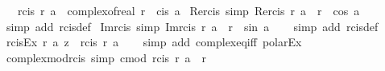 \begin{isabellebody}
\ \ \ {\isachardoublequoteopen}rcis\ r\ a\ {\isacharequal}{\kern0pt}\ complex{\isacharunderscore}{\kern0pt}of{\isacharunderscore}{\kern0pt}real\ r\ {\isacharasterisk}{\kern0pt}\ cis\ a{\isachardoublequoteclose}\isanewline
\isanewline
{}\isamarkupfalse%
\ Re{\isacharunderscore}{\kern0pt}rcis\ {\isacharbrackleft}{\kern0pt}simp{\isacharbrackright}{\kern0pt}{\isacharcolon}{\kern0pt}\ {\isachardoublequoteopen}Re{\isacharparenleft}{\kern0pt}rcis\ r\ a{\isacharparenright}{\kern0pt}\ {\isacharequal}{\kern0pt}\ r\ {\isacharasterisk}{\kern0pt}\ cos\ a{\isachardoublequoteclose}\isanewline
%
\isadelimproof
\ \ %
\endisadelimproof
%
\isatagproof
{}\isamarkupfalse%
\ {\isacharparenleft}{\kern0pt}simp\ add{\isacharcolon}{\kern0pt}\ rcis{\isacharunderscore}{\kern0pt}def{\isacharparenright}{\kern0pt}%
\endisatagproof
{\isafoldproof}%
%
\isadelimproof
\isanewline
%
\endisadelimproof
\isanewline
{}\isamarkupfalse%
\ Im{\isacharunderscore}{\kern0pt}rcis\ {\isacharbrackleft}{\kern0pt}simp{\isacharbrackright}{\kern0pt}{\isacharcolon}{\kern0pt}\ {\isachardoublequoteopen}Im{\isacharparenleft}{\kern0pt}rcis\ r\ a{\isacharparenright}{\kern0pt}\ {\isacharequal}{\kern0pt}\ r\ {\isacharasterisk}{\kern0pt}\ sin\ a{\isachardoublequoteclose}\isanewline
%
\isadelimproof
\ \ %
\endisadelimproof
%
\isatagproof
{}\isamarkupfalse%
\ {\isacharparenleft}{\kern0pt}simp\ add{\isacharcolon}{\kern0pt}\ rcis{\isacharunderscore}{\kern0pt}def{\isacharparenright}{\kern0pt}%
\endisatagproof
{\isafoldproof}%
%
\isadelimproof
\isanewline
%
\endisadelimproof
\isanewline
{}\isamarkupfalse%
\ rcis{\isacharunderscore}{\kern0pt}Ex{\isacharcolon}{\kern0pt}\ {\isachardoublequoteopen}{\isasymexists}r\ a{\isachardot}{\kern0pt}\ z\ {\isacharequal}{\kern0pt}\ rcis\ r\ a{\isachardoublequoteclose}\isanewline
%
\isadelimproof
\ \ %
\endisadelimproof
%
\isatagproof
{}\isamarkupfalse%
\ {\isacharparenleft}{\kern0pt}simp\ add{\isacharcolon}{\kern0pt}\ complex{\isacharunderscore}{\kern0pt}eq{\isacharunderscore}{\kern0pt}iff\ polar{\isacharunderscore}{\kern0pt}Ex{\isacharparenright}{\kern0pt}%
\endisatagproof
{\isafoldproof}%
%
\isadelimproof
\isanewline
%
\endisadelimproof
\isanewline
{}\isamarkupfalse%
\ complex{\isacharunderscore}{\kern0pt}mod{\isacharunderscore}{\kern0pt}rcis\ {\isacharbrackleft}{\kern0pt}simp{\isacharbrackright}{\kern0pt}{\isacharcolon}{\kern0pt}\ {\isachardoublequoteopen}cmod\ {\isacharparenleft}{\kern0pt}rcis\ r\ a{\isacharparenright}{\kern0pt}\ {\isacharequal}{\kern0pt}\ {\isasymbar}r{\isasymbar}{\isachardoublequoteclose}\isanewline

\end{isabellebody}
